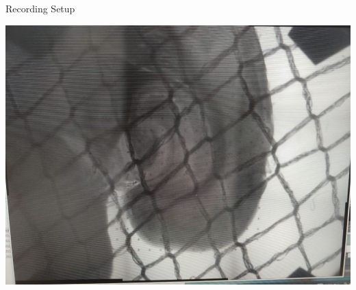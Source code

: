 \documentclass[10pt]{beamer}
\begin{document}
\begin{frame}[allowframebreaks]{Recording Setup}
\begin{center}
    \includegraphics[keepaspectratio,width=0.9\framewidth]{img/1_setup_slice_.jpg}

 \end{center}
\end{frame}
\end{document}
